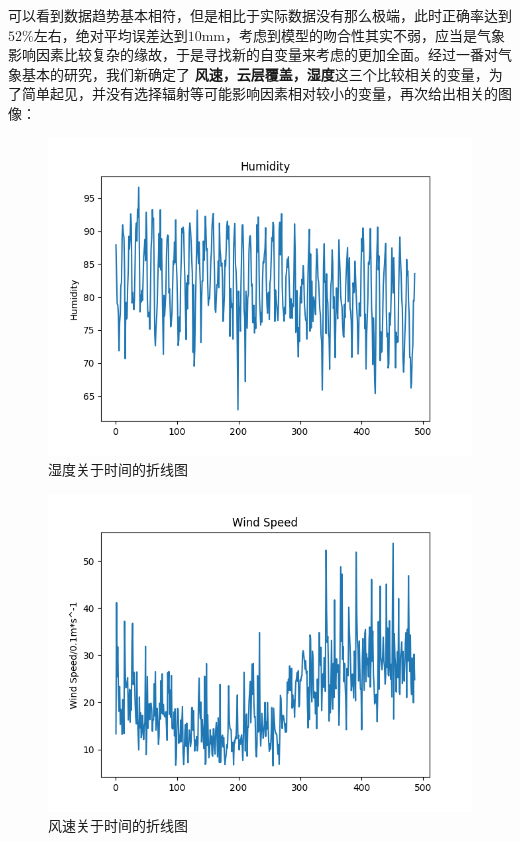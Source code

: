 \documentclass[UTF8, a4paper]{ctexart}
\begin{document}
可以看到数据趋势基本相符，但是相比于实际数据没有那么极端，此时正确率达到$52\%$左右，绝对平均误差达到$10$mm，考虑到模型的吻合性其实不弱，应当是气象影响因素比较复杂的缘故，于是寻找新的自变量来考虑的更加全面。经过一番对气象基本的研究，我们新确定了 \textbf{风速，云层覆盖，湿度}这三个比较相关的变量，为了简单起见，并没有选择辐射等可能影响因素相对较小的变量，再次给出相关的图像：
\begin{figure}[h!]
	\centering
	\includegraphics[scale=0.5]{hu.png}
	\caption{湿度关于时间的折线图}
\end{figure}


\begin{figure}[h!]
	\centering
	\includegraphics[scale=0.5]{fg.png}
	\caption{风速关于时间的折线图}
\end{figure}
\end{document}

